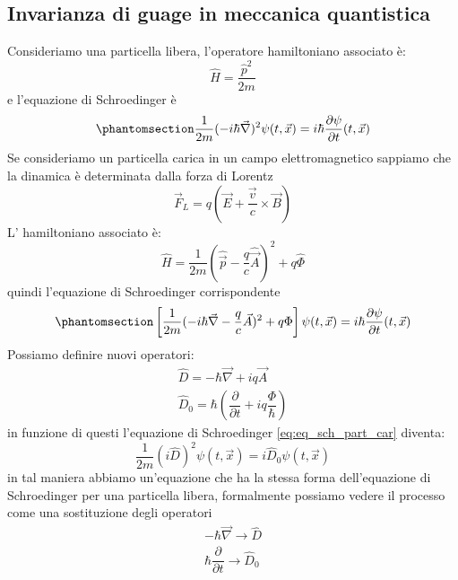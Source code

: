 \subsection{Invarianza di
guage in meccanica quantistica}
Consideriamo una particella libera, l'operatore hamiltoniano associato è:
\begin{equation}
    \hat{H}=\dfrac{\hat{p}^2}{2m}
\end{equation}
 e l'equazione di Schroedinger è
\begin{equation}\phantomsection\label{eq:eq_sch_part_lib}
    \dfrac{1}{2m}(-i\hbar\Vec{\nabla})^2\psi(t,\Vec{x})=i\hbar\dfrac{\partial \psi}{\partial t}(t,\Vec{x})
\end{equation}
Se consideriamo un particella carica in un campo elettromagnetico sappiamo che la dinamica è determinata dalla forza di Lorentz
\begin{equation}
   \Vec{F}_L=q(\Vec{E}+\dfrac{\Vec{v}}{c}\times\Vec{B})
\end{equation}
    L' hamiltoniano associato è:
\begin{equation}
 \hat{H}=\dfrac{1}{2m}\left(\hat{\Vec{p}}-\dfrac{q}{c}\hat{\Vec{A}}\right)^2+q\hat{\Phi}
\end{equation}
quindi l'equazione di Schroedinger corrispondente
\begin{equation}\phantomsection\label{eq:eq_sch_part_car}
     \left[\dfrac{1}{2m}(-i\hbar\Vec{\nabla}-\dfrac{q}{c}\Vec{A})^2+q\Phi\right]\psi(t,\Vec{x})=i\hbar\dfrac{\partial \psi}{\partial t}(t,\Vec{x})
\end{equation}
Possiamo definire nuovi operatori:
\begin{equation}
    \begin{gathered}
        \hat{D}=-\hbar\Vec{\nabla}+iq\Vec{A}\\
        \hat{D}_0=\hbar\left(\dfrac{\partial}{\partial t}+iq\dfrac{\Phi}{\hbar}\right)
    \end{gathered}
\end{equation}
in funzione di questi l'equazione di Schroedinger \eqref{eq:eq_sch_part_car} diventa:
\begin{equation}
     \dfrac{1}{2m}(i\hat{D})^2\psi(t,\Vec{x})=i\hat{D}_0\psi(t,\Vec{x})
\end{equation}
in tal maniera abbiamo un'equazione che ha la stessa forma dell'equazione di Schroedinger per una particella libera, formalmente possiamo vedere il processo come una sostituzione degli operatori
\begin{equation}
    \begin{gathered}
      -\hbar\Vec{\nabla} \xrightarrow{} \hat{D}\\
      \hbar\dfrac{\partial}{\partial t} \xrightarrow{} \hat{D}_0
    \end{gathered}
\end{equation}
